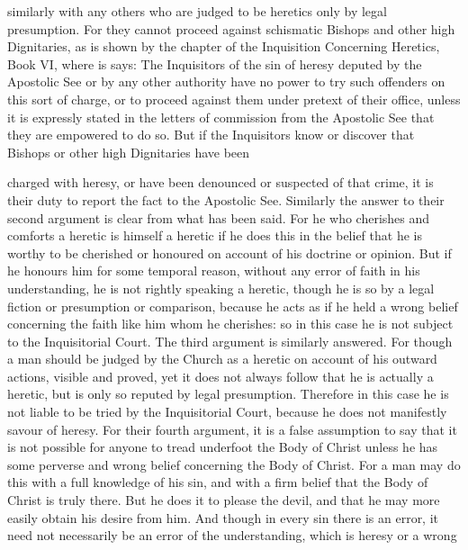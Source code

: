        similarly with any others who are judged to be heretics only by legal presumption. For they
       cannot proceed against schismatic Bishops and other high Dignitaries, as is shown by the
       chapter of the Inquisition Concerning Heretics, Book VI, where is says: The Inquisitors of
       the sin of heresy deputed by the Apostolic See or by any other authority have no power to
       try such offenders on this sort of charge, or to proceed against them under pretext of their
       office, unless it is expressly stated in the letters of commission from the Apostolic See that
       they are empowered to do so.
             But if the Inquisitors know or discover that Bishops or other high Dignitaries have been

       charged with heresy, or have been denounced or suspected of that crime, it is their duty to
       report the fact to the Apostolic See.
             Similarly the answer to their second argument is clear from what has been said. For he
       who cherishes and comforts a heretic is himself a heretic if he does this in the belief that he
       is worthy to be cherished or honoured on account of his doctrine or opinion. But if he
       honours him for some temporal reason, without any error of faith in his understanding, he is
       not rightly speaking a heretic, though he is so by a legal fiction or presumption or
       comparison, because he acts as if he held a wrong belief concerning the faith like him whom
       he cherishes: so in this case he is not subject to the Inquisitorial Court.
             The third argument is similarly answered. For though a man should be judged by the
       Church as a heretic on account of his outward actions, visible and proved, yet it does not
       always follow that he is actually a heretic, but is only so reputed by legal presumption.
       Therefore in this case he is not liable to be tried by the Inquisitorial Court, because he does
       not manifestly savour of heresy.
             For their fourth argument, it is a false assumption to say that it is not possible for
       anyone to tread underfoot the Body of Christ unless he has some perverse and wrong belief
       concerning the Body of Christ. For a man may do this with a full knowledge of his sin, and
       with a firm belief that the Body of Christ is truly there. But he does it to please the devil,
       and that he may more easily obtain his desire from him. And though in every sin there is an
       error, it need not necessarily be an error of the understanding, which is heresy or a wrong
